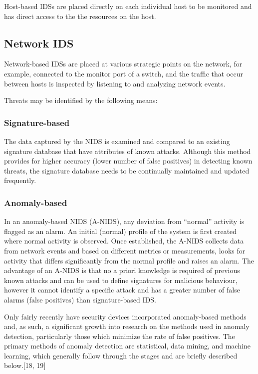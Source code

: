 \documentclass[11pt,]{article}
\begin{document}
Host-based IDSs are placed directly on each individual host to be
monitored and has direct access to the the resources on the host.

\subsection{Network IDS}\label{network-ids}

Network-based IDSs are placed at various strategic points on the
network, for example, connected to the monitor port of a switch, and the
traffic that occur between hosts is inspected by listening to and
analyzing network events.

Threats may be identified by the following means:

\subsubsection{Signature-based}\label{signature-based}

The data captured by the NIDS is examined and compared to an existing
signature database that have attributes of known attacks. Although this
method provides for higher accuracy (lower number of false positives) in
detecting known threats, the signature database needs to be continually
maintained and updated frequently.

\subsubsection{Anomaly-based}\label{anomaly-based}

In an anomaly-based NIDS (A-NIDS), any deviation from ``normal''
activity is flagged as an alarm. An initial (normal) profile of the
system is first created where normal activity is observed. Once
established, the A-NIDS collects data from network events and based on
different metrics or measurements, looks for activity that differs
significantly from the normal profile and raises an alarm. The advantage
of an A-NIDS is that no a priori knowledge is required of previous known
attacks and can be used to define signatures for malicious behaviour,
however it cannot identify a specific attack and has a greater number of
false alarms (false positives) than signature-based IDS.

Only fairly recently have security devices incorporated anomaly-based
methods and, as such, a significant growth into research on the methods
used in anomaly detection, particularly those which minimize the rate of
false positives. The primary methods of anomaly detection are
statistical, data mining, and machine learning, which generally follow
through the stages and are briefly described below.{[}18, 19{]}
\end{document}
